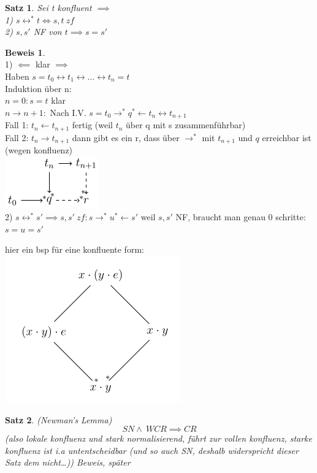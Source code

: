 \documentclass{article}
\newtheorem{satz}{Satz}
\theoremstyle{definition}
\newtheorem{beweis}{Beweis}[section]
\begin{document}
	\begin{satz} Sei t konfluent $\implies$\\
	1) $s\leftrightarrow^* t\iff s,t\ zf$\\
	2) $s,s'$ NF von $t\implies s=s'$\\
	\end{satz}
	\begin{beweis}\ \\
	1) $\impliedby$ klar $\implies$\\
	Haben $s=t_0 \leftrightarrow t_1\leftrightarrow \dots\leftrightarrow t_n=t$\\
	Induktion über n:\\
	$n=0: s=t$ klar\\
	$n\to n+1:$ Nach I.V. $s=t_0\to^*q ^*\gets t_n\leftrightarrow t_{n+1}$\\
	Fall 1: $t_n\gets t_{n+1}$ fertig (weil $t_n$ über q mit s zusammenführbar)\\
	Fall 2: $t_n\to t_{n+1}$ dann gibt es ein r, dass über $\to^*$ mit $t_{n+1}$ und $q$ erreichbar ist (wegen konfluenz)\\
	\includegraphics[scale=0.5]{images/symmetrischTransitiverAbschlussKonfluenz.png}\\
	2) $s\leftrightarrow^* s'\implies s,s'\ zf: s\to^* u^*\gets s'$ weil $s,s'$ NF, braucht man genau 0 schritte: $s=u=s'$\\
	\end{beweis}
	hier ein bsp für eine konfluente form:\\
	\includegraphics[scale=0.5]{images/konfluent.png}\\
	\begin{satz} (Newman's Lemma)\label{Newman's Lemma}\\
	\[SN \land\ WCR \implies CR\]
	(also lokale konfluenz und stark normalisierend, führt zur vollen konfluenz, starke konfluenz ist i.a untentscheidbar (und so auch SN, deshalb widerspricht dieser Satz dem nicht\dots))
	Beweis, später\\
	\end{satz}
\end{document}
